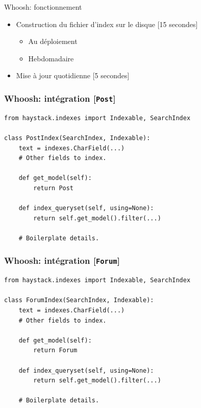 \documentclass{beamer}
\begin{document}
\begin{frame}{Whoosh: fonctionnement}
    \begin{itemize}
        \item Construction du fichier d'index sur le disque \hfill [15 secondes]

        \begin{itemize}
            \item Au déploiement
            \item Hebdomadaire
        \end{itemize}

        \item Mise à jour quotidienne \hfill [5 secondes]

    \end{itemize}
\end{frame}

\begin{frame}[fragile]
    \frametitle{Whoosh: intégration \hfill [\texttt{Post}]}

    \begin{verbatim}
from haystack.indexes import Indexable, SearchIndex

class PostIndex(SearchIndex, Indexable):
    text = indexes.CharField(...)
    # Other fields to index.

    def get_model(self):
        return Post

    def index_queryset(self, using=None):
        return self.get_model().filter(...)

    # Boilerplate details.
    \end{verbatim}
\end{frame}

\begin{frame}[fragile]
    \frametitle{Whoosh: intégration \hfill [\texttt{Forum}]}

    \begin{verbatim}
from haystack.indexes import Indexable, SearchIndex

class ForumIndex(SearchIndex, Indexable):
    text = indexes.CharField(...)
    # Other fields to index.

    def get_model(self):
        return Forum

    def index_queryset(self, using=None):
        return self.get_model().filter(...)

    # Boilerplate details.
    \end{verbatim}
\end{frame}
\end{document}
